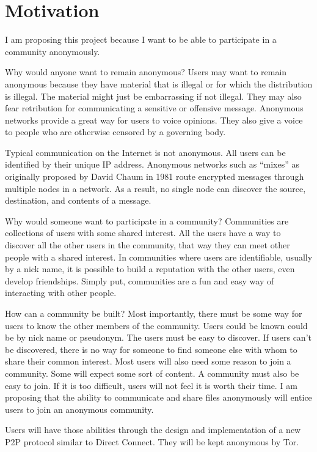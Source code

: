 \documentclass{article}
\begin{document}
\section{Motivation}
I am proposing this project because I want to be able to participate in a community anonymously.

Why would anyone want to remain anonymous?  Users may want to remain anonymous because they have material that is illegal or for which the distribution is illegal.  The material might just be embarrassing if not illegal.  They may also fear retribution for communicating a sensitive or offensive message.  Anonymous networks provide a great way for users to voice opinions.  They also give a voice to people who are otherwise censored by a governing body.

Typical communication on the Internet is not anonymous.  All users can be identified by their unique IP address.  Anonymous networks such as ``mixes'' as originally proposed by David Chaum in 1981 route encrypted messages through multiple nodes in a network.  As a result, no single node can discover the source, destination, and contents of a message.

Why would someone want to participate in a community?  Communities are collections of users with some shared interest.  All the users have a way to discover all the other users in the community, that way they can meet other people with a shared interest.  In communities where users are identifiable, usually by a nick name, it is possible to build a reputation with the other users, even develop friendships.  Simply put, communities are a fun and easy way of interacting with other people.

How can a community be built?  Most importantly, there must be some way for users to know the other members of the community.  Users could be known could be by nick name or pseudonym.  The users must be easy to discover.  If users can't be discovered, there is no way for someone to find someone else with whom to share their common interest.  Most users will also need some reason to join a community.  Some will expect some sort of content.  A community must also be easy to join.  If it is too difficult, users will not feel it is worth their time.  I am proposing that the ability to communicate and share files anonymously will entice users to join an anonymous community.

Users will have those abilities through the design and implementation of a new P2P protocol similar to Direct Connect.  They will be kept anonymous by Tor.
\end{document}
